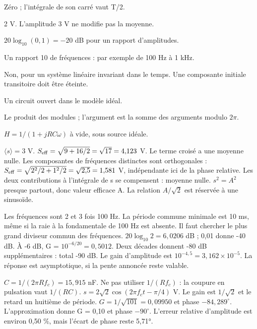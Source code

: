 Zéro ; l’intégrale de son carré vaut T/2.

2 V. L’amplitude 3 V ne modifie pas la moyenne.

$20\log_{10}(0{,}1)=-20$ dB pour un rapport d’amplitudes.

Un rapport 10 de fréquences : par exemple de 100 Hz à 1 kHz.

Non, pour un système linéaire invariant dans le temps. Une composante initiale transitoire doit être éteinte.

Un circuit ouvert dans le modèle idéal.

Le produit des modules ; l’argument est la somme des arguments modulo $2\pi$.

$H=1/(1+jRC\omega)$ à vide, sous source idéale.


$\langle s\rangle=3$ V. $S_{\rm eff}=\sqrt{9+16/2}=\sqrt{17}=4{,}123$ V. Le terme croisé a une moyenne nulle.
Les composantes de fréquences distinctes sont orthogonales : $S_{\rm eff}=\sqrt{2^2/2+1^2/2}=\sqrt{2{,}5}=1{,}581$ V, indépendante ici de la phase relative.
Les deux contributions à l’intégrale de s se compensent : moyenne nulle. $s^2=A^2$ presque partout, donc valeur efficace A. La relation $A/\sqrt2$ est réservée à une sinusoïde.


Les fréquences sont 2 et 3 fois 100 Hz. La période commune minimale est 10 ms, même si la raie à la fondamentale de 100 Hz est absente. Il faut chercher le plus grand diviseur commun des fréquences.
$20\log_{10}2=6{,}0206$ dB ; 0,01 donne -40 dB. À -6 dB, G = $10^{-6/20}=0{,}5012$.
Deux décades donnent -80 dB supplémentaires : total -90 dB. Le gain d’amplitude est $10^{-4{,}5}=3{,}162\times10^{-5}$. La réponse est asymptotique, si la pente annoncée reste valable.


$C=1/(2\pi Rf_c)=15{,}915$ nF. Ne pas utiliser $1/(Rf_c)$ : la coupure en pulsation vaut $1/(RC)$.
$s=2\sqrt2\cos(2\pi f_ct-\pi/4)$ V. Le gain est $1/\sqrt2$ et le retard un huitième de période.
$G=1/\sqrt{101}=0{,}09950$ et phase $-84{,}289^\circ$. L’approximation donne G = 0,10 et phase $-90^\circ$. L’erreur relative d’amplitude est environ 0,50 \%, mais l’écart de phase reste 5,71°.


